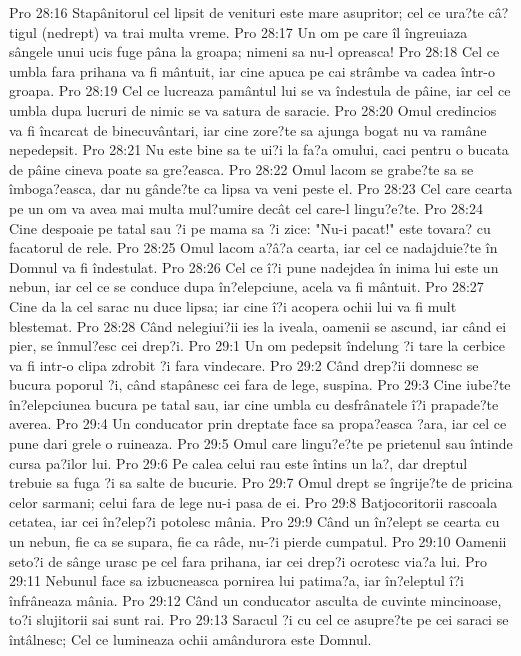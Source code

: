 Pro 28:16  Stapânitorul cel lipsit de venituri este mare asupritor; cel ce ura?te câ?tigul (nedrept) va trai multa vreme.
Pro 28:17  Un om pe care îl îngreuiaza sângele unui ucis fuge pâna la groapa; nimeni sa nu-l opreasca!
Pro 28:18  Cel ce umbla fara prihana va fi mântuit, iar cine apuca pe cai strâmbe va cadea într-o groapa.
Pro 28:19  Cel ce lucreaza pamântul lui se va îndestula de pâine, iar cel ce umbla dupa lucruri de nimic se va satura de saracie.
Pro 28:20  Omul credincios va fi încarcat de binecuvântari, iar cine zore?te sa ajunga bogat nu va ramâne nepedepsit.
Pro 28:21  Nu este bine sa te ui?i la fa?a omului, caci pentru o bucata de pâine cineva poate sa gre?easca.
Pro 28:22  Omul lacom se grabe?te sa se îmboga?easca, dar nu gânde?te ca lipsa va veni peste el.
Pro 28:23  Cel care cearta pe un om va avea mai multa mul?umire decât cel care-l lingu?e?te.
Pro 28:24  Cine despoaie pe tatal sau ?i pe mama sa ?i zice: "Nu-i pacat!" este tovara? cu facatorul de rele.
Pro 28:25  Omul lacom a?â?a cearta, iar cel ce nadajduie?te în Domnul va fi îndestulat.
Pro 28:26  Cel ce î?i pune nadejdea în inima lui este un nebun, iar cel ce se conduce dupa în?elepciune, acela va fi mântuit.
Pro 28:27  Cine da la cel sarac nu duce lipsa; iar cine î?i acopera ochii lui va fi mult blestemat.
Pro 28:28  Când nelegiui?ii ies la iveala, oamenii se ascund, iar când ei pier, se înmul?esc cei drep?i.
Pro 29:1  Un om pedepsit îndelung ?i tare la cerbice va fi intr-o clipa zdrobit ?i fara vindecare.
Pro 29:2  Când drep?ii domnesc se bucura poporul ?i, când stapânesc cei fara de lege, suspina.
Pro 29:3  Cine iube?te în?elepciunea bucura pe tatal sau, iar cine umbla cu desfrânatele î?i prapade?te averea.
Pro 29:4  Un conducator prin dreptate face sa propa?easca ?ara, iar cel ce pune dari grele o ruineaza.
Pro 29:5  Omul care lingu?e?te pe prietenul sau întinde cursa pa?ilor lui.
Pro 29:6  Pe calea celui rau este întins un la?, dar dreptul trebuie sa fuga ?i sa salte de bucurie.
Pro 29:7  Omul drept se îngrije?te de pricina celor sarmani; celui fara de lege nu-i pasa de ei.
Pro 29:8  Batjocoritorii rascoala cetatea, iar cei în?elep?i potolesc mânia.
Pro 29:9  Când un în?elept se cearta cu un nebun, fie ca se supara, fie ca râde, nu-?i pierde cumpatul.
Pro 29:10  Oamenii seto?i de sânge urasc pe cel fara prihana, iar cei drep?i ocrotesc via?a lui.
Pro 29:11  Nebunul face sa izbucneasca pornirea lui patima?a, iar în?eleptul î?i înfrâneaza mânia.
Pro 29:12  Când un conducator asculta de cuvinte mincinoase, to?i slujitorii sai sunt rai.
Pro 29:13  Saracul ?i cu cel ce asupre?te pe cei saraci se întâlnesc; Cel ce lumineaza ochii amândurora este Domnul.
